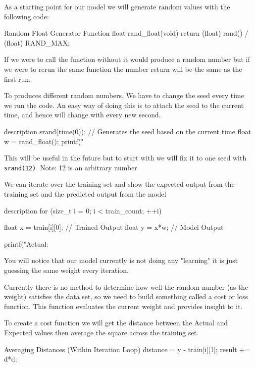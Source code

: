 \documentclass{report}
\begin{document}
As a starting point for our model we will generate random values with the following code:


\begin{code}[language=c]{Random Float Generator Function}
float rand_float(void){
    return (float) rand() / (float) RAND_MAX;
}
\end{code}

If we were to call the function without it would produce a random number but if we were to rerun the same function the number return will be the same as the first run. 

To produces different random numbers, We have to change the seed every time we run the code. An easy way of doing this is to attach the seed to the current time, and hence will change with every new second.

\begin{code}[language=c]{description}
srand(time(0)); // Generates the seed based on the current time
float w = rand_float(); 
printf("%
\end{code}


This will be useful in the future but to start with we will fix it to one seed with \verb|srand(12)|. Note: 12 is an arbitrary number


We can iterate over the training set and show the expected output from the training set and the predicted output from the model 

\begin{code}[language=c]{description}
for (size_t i = 0; i < train_count; ++i) {
    float x  = train[i][0]; // Trained Output
    float y  = x*w;  // Model Output

    printf("Actual: %
}
\end{code}


You will notice that our model currently is not doing any "learning" it is just guessing the same weight every iteration.


Currently there is no method to determine how well the random number (as the weight) satisfies the data set, so we need to build something called a cost or loss function. This function evaluates the current weight and provides insight to it.

To create a cost function we will get the distance between the Actual and Expected values then average the square across the training set.


\begin{code}[language=c]{Averaging Distances (Within Iteration Loop)}
    distance = y - train[i][1];
    result += d*d;
\end{code}
\end{document}
